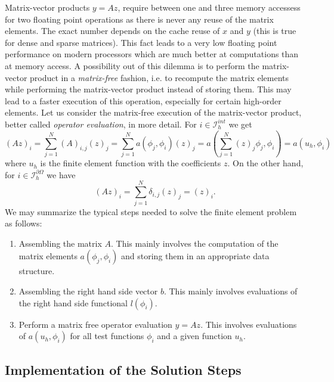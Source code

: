 \documentclass[a4paper,12pt]{article}
\begin{document}
Matrix-vector products $y=Az$, require between one and three memory accessess for two
floating point operations as there is never any reuse of the matrix elements.
The exact number depends on the cache reuse of $x$ and $y$ (this is true for
dense and sparse matrices). This fact leads to a very low floating point performance
on modern processors which are much better at computations than at memory access.
A possibility out of this dilemma is to perform the matrix-vector  product in a
{\em matrix-free} fashion, i.e. to recompute the matrix elements while performing
the matrix-vector product instead of storing them. This may lead to a faster 
execution of this operation, especially for certain high-order elements.
Let us consider the matrix-free execution of the matrix-vector product, 
better called {\em operator evaluation}, in more detail.
For $i\in\mathcal{I}_h^{int}$ we get
\begin{equation}
(Az)_i = \sum_{j=1}^N (A)_{i,j} (z)_j = \sum_{j=1}^N a(\phi_j,\phi_i) (z)_j = 
 a\left(\sum_{j=1}^N (z)_j\phi_j,\phi_i\right) = a(u_h,\phi_i) 
\label{eq:opeval}
\end{equation}
where $u_h$ is the finite element function with the coefficients $z$. On the other
hand, for $i\in\mathcal{I}_h^{\partial\Omega}$ we have
\begin{equation*}
(Az)_i = \sum_{j=1}^N \delta_{i,j} (z)_j = (z)_i .
\end{equation*}
We may summarize the typical steps needed to solve the 
finite element problem as follows:
\begin{enumerate}[1)]
\item Assembling the matrix $A$. This mainly involves the computation of the matrix
elements $a(\phi_j,\phi_i)$ and storing them in an appropriate data structure.
\item Assembling the right hand side vector $b$. This mainly involves evaluations of
the right hand side functional $l(\phi_i)$.
\item Perform a matrix free operator evaluation $y=Az$. This involves evaluations
of $a(u_h,\phi_i)$ for all test functions $\phi_i$ and a given function $u_h$.
\end{enumerate}

\subsection{Implementation of the Solution Steps}\label{subs:impl}
\end{document}
